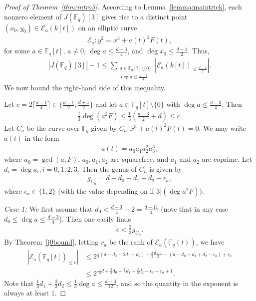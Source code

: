 \documentclass[11pt]{article}
\theoremstyle{plain}
\theoremstyle{definition}
\begin{document}
\begin{proof}[Proof of Theorem~\ref{thm:intro3}]
According to Lemma~\ref{lemma:maintrick}, each nonzero element of $J(\mathbb{F}_q)[3]$ gives rise to a distinct point $(x_0,y_0)\in \mathcal{E}_a(k[t])$ on an elliptic curve 
\begin{align*}
\mathcal{E}_a:y^2=x^3+a(t)^2F(t), 
\end{align*} 
for some $a\in \mathbb{F}_q[t]$, $a\neq 0$, $\deg a\leq \frac{d-3}{4}$, and $\deg x_0\leq \frac{d-1}{2}$. Thus,
\begin{align*}
|J(\mathbb{F}_q)[3]|-1\leq \sum_{\substack{a\in \mathbb{F}_q[t]\setminus\{0\}\\ \deg a\leq \frac{d-3}{4}}}\left|\mathcal{E}_a(k[t])_{\leq \frac{d-1}{2}}\right|.
\end{align*} 
We now bound the right-hand side of this inequality.

Let $c=2\lceil\frac{d-1}{4}\rceil\in \{\frac{d-1}{2},\frac{d+1}{2}\}$ and let $a\in \mathbb{F}_q[t]\setminus\{0\}$ with $\deg a\leq \frac{d-3}{4}$. Then
\begin{align*}
\frac{1}{3}\deg (a^2F)\leq \frac{1}{3}\left(\frac{d-3}{2}+d\right)\leq c.
\end{align*}
Let $C_a$ be the curve over $\mathbb{F}_q$ given by $C_a:x^3+a(t)^2F(t)=0$. We may write $a(t)$ in the form
\begin{align*}
a(t)=a_0a_1a_2^2a_3^3,
\end{align*}
where $a_0=\gcd(a,F)$, $a_0,a_1,a_2$ are squarefree, and $a_1$ and $a_2$ are coprime.  Let $d_i=\deg a_i, i=0,1,2,3$. Then the genus of $C_a$ is given by
\begin{align*}
g_{C_a}=d-d_0+d_1+d_2-\epsilon_a,
\end{align*}
where $\epsilon_a\in \{1,2\}$ (with the value depending on if $3|(\deg a^2F)$).

\emph{Case 1:} We first assume that $d_0< \frac{d-3}{4}-2=\frac{d-11}{4}$ (note that in any case $d_0\leq \deg a\leq \frac{d-3}{4}$). Then one easily finds
\begin{align*}
c<\frac{2}{3}g_{C_a}.
\end{align*}
By Theorem~\ref{j0bound}, letting $r_a$ be the rank of $\mathcal{E}_a(\mathbb{F}_q(t))$, we have
\begin{align*}
\left|\mathcal{E}_a(\mathbb{F}_q[t])_{\leq c}\right|&\leq 2^{\frac{1}{3}(d-d_0+2d_1+d_2)+\frac{3}{2}\frac{d+1}{2}- (d-d_0+d_1+d_2-\epsilon_a)+r_a}\\
&\leq 2^{\frac{1}{12}d+\frac{2}{3}d_0-\frac{1}{3}d_1-\frac{2}{3}d_2+\epsilon_a+r_a+1}.
\end{align*}
Note that $\frac{1}{3}d_1+\frac{2}{3}d_2\leq \frac{1}{3}\deg a\leq \frac{d-3}{12}$, and so the quantity in the exponent is always at least $1$.


\end{proof}
\end{document}
